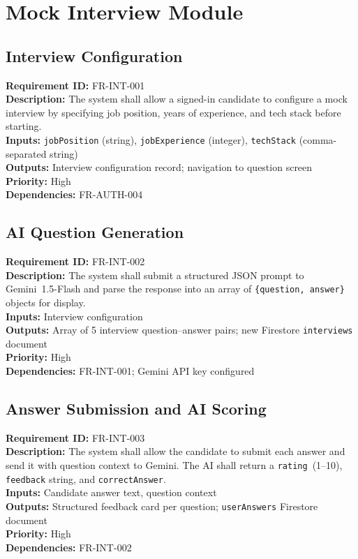 \documentclass{fisatinternship}
\begin{document}
\vspace{0.4cm}

\section{Mock Interview Module}

\subsection{Interview Configuration}
\textbf{Requirement ID:} FR-INT-001\\
\textbf{Description:} The system shall allow a signed-in candidate to configure a mock
interview by specifying job position, years of experience, and tech stack before starting.\\
\textbf{Inputs:} \texttt{jobPosition} (string), \texttt{jobExperience} (integer),
\texttt{techStack} (comma-separated string)\\
\textbf{Outputs:} Interview configuration record; navigation to question screen\\
\textbf{Priority:} High\\
\textbf{Dependencies:} FR-AUTH-004

\vspace{0.4cm}

\subsection{AI Question Generation}
\textbf{Requirement ID:} FR-INT-002\\
\textbf{Description:} The system shall submit a structured JSON prompt to Gemini~1.5-Flash
and parse the response into an array of \texttt{\{question, answer\}} objects for display.\\
\textbf{Inputs:} Interview configuration\\
\textbf{Outputs:} Array of 5 interview question--answer pairs; new Firestore
\texttt{interviews} document\\
\textbf{Priority:} High\\
\textbf{Dependencies:} FR-INT-001; Gemini API key configured

\vspace{0.4cm}

\subsection{Answer Submission and AI Scoring}
\textbf{Requirement ID:} FR-INT-003\\
\textbf{Description:} The system shall allow the candidate to submit each answer and send
it with question context to Gemini. The AI shall return a \texttt{rating}~(1--10),
\texttt{feedback} string, and \texttt{correctAnswer}.\\
\textbf{Inputs:} Candidate answer text, question context\\
\textbf{Outputs:} Structured feedback card per question; \texttt{userAnswers} Firestore document\\
\textbf{Priority:} High\\
\textbf{Dependencies:} FR-INT-002
\end{document}
